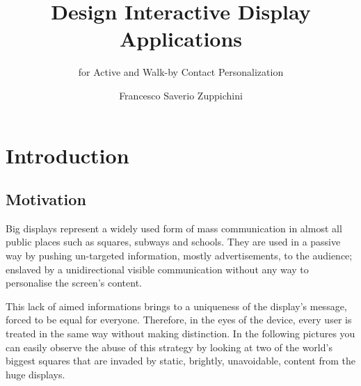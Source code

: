 \documentclass[]{usiinfbachelorproject}
\author{Francesco Saverio Zuppichini}
\title{Design Interactive Display Applications}
\subtitle{for Active and Walk-by Contact Personalization}
\begin{document}
\maketitle

\section{Introduction}
\subsection{Motivation}

Big displays represent a widely used form of mass communication in almost all public places such as squares, subways and schools. They are used in a passive way by pushing un-targeted information, mostly advertisements, to the audience; enslaved by a unidirectional visible communication without any way to personalise the screen's content.

This lack of aimed informations brings to a uniqueness of the display's message, forced to be equal for everyone. Therefore, in the eyes of the device, every user is treated in the same way without making distinction. In the following pictures you can easily observe the abuse of this strategy by looking at two of the world's biggest squares that are invaded by static, brightly, unavoidable, content from the huge displays.
\begin{figure}[H]
  \centering
  \hfill
\end{figure} 
\end{document}
